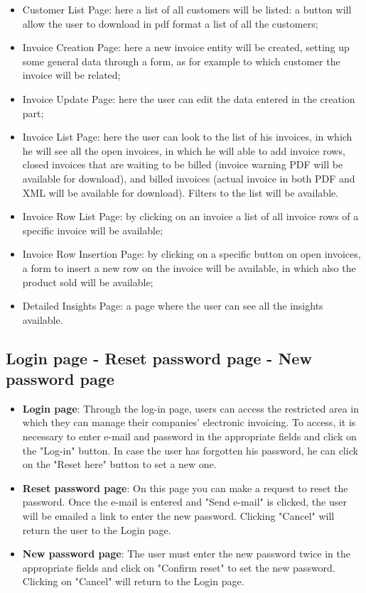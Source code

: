 \begin{itemize}
    \item Customer List Page: here a list of all customers will be listed: a button will allow the user to download in pdf format a list of all the customers;
    \item Invoice Creation Page: here a new invoice entity will be created, setting up some general data through a form, as for example to which customer the invoice will be related;
    \item Invoice Update Page: here the user can edit the data entered in the creation part;
    \item Invoice List Page: here the user can look to the list of his invoices, in which he will see all the open invoices, in which he will able to add invoice rows, closed invoices that are waiting to be billed (invoice warning PDF will be available for download), and billed invoices (actual invoice in both PDF and XML will be available for download). Filters to the list will be available.
    \item Invoice Row List Page: by clicking on an invoice a list of all invoice rows of a specific invoice will be available;
    \item Invoice Row Insertion Page: by clicking on a specific button on open invoices, a form to insert a new row on the invoice will be available, in which also the product sold will be available;
    \item Detailed Insights Page: a page where the user can see all the insights available.
\end{itemize}
\newpage


\subsection{Login page - Reset password page - New password page}

\begin{itemize}
    \item \textbf{Login page}: Through the log-in page, users can access the restricted area in which they can manage their companies' electronic invoicing. To access, it is necessary to enter e-mail and password in the appropriate fields and click on the "Log-in" button.
In case the user has forgotten his password, he can click on the "Reset here" button to set a new one.
    \item \textbf{Reset password page}: On this page you can make a request to reset the password. Once the e-mail is entered and "Send e-mail" is clicked, the user will be emailed a link to enter the new password. Clicking "Cancel" will return the user to the Login page.
    \item \textbf{New password page}: The user must enter the new password twice in the appropriate fields and click on "Confirm reset" to set the new password. Clicking on "Cancel" will return to the Login page.
\end{itemize}

